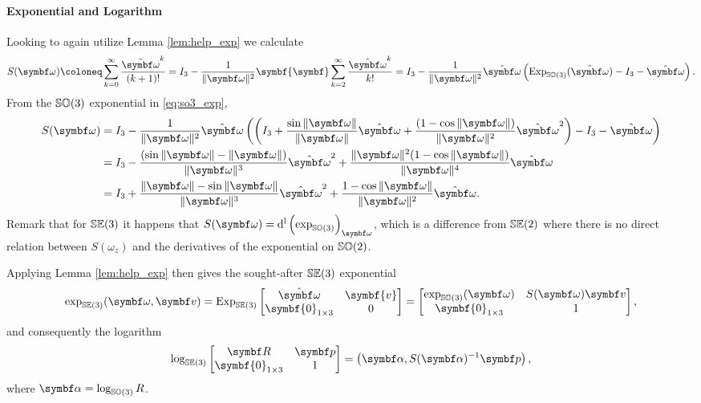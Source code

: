 \paragraph{Exponential and Logarithm}

Looking to again utilize Lemma \ref{lem:help_exp} we calculate
\begin{equation}
  S(\bomega) \coloneq \sum\limits_{k=0}^\infty \frac{\hat{\bomega}^{k}} {(k+1)!} = I_3 - \frac{1}{\| \symbf\omega \|^2} {\symbf{\symbf}} \sum\limits_{k=2}^\infty \frac{\hat{\bomega}^k}{k!} = I_3  - \frac{1}{\| \symbf\omega \|^2} \hat {\bomega} \left( \Exp_\SOthree(\hat {\bomega}) - I_3 - \hat{\bomega} \right).
\end{equation}
From the ${\mathbb{SO}(3)}$ exponential in \eqref{eq:so3_exp},
\begin{equation}
  \label{eq:so3_leftjac}
  \begin{aligned}
    S(\bomega)
     & = I_3  - \frac{1}{\| \bomega \|^2} \hat {\bomega} \left( \left( I_3 + \frac{ \sin \| \bomega \|}{\| \bomega \|} \hat{\bomega} + \frac{ (1 - \cos \| \bomega \|)}{\| \bomega \|^2} \hat{\bomega}^2 \right) - I_3 - \hat{\bomega} \right)
    \\
     & = I_3 - \frac{ (\sin \| \bomega \| -\| \bomega \|)  }{\| \bomega\|^3} \hat {\bomega}^2 + \frac{\| \bomega \|^2  (1 - \cos \| \bomega \| ) }{\| \bomega \|^4} \hat {\bomega}
    \\
     & = I_3 + \frac{ \| \bomega \| - \sin \| \bomega \| }{\| \bomega\|^3} \hat {\bomega}^2 + \frac{1 - \cos \| \bomega \|}{\| \bomega \|^2} \hat {\bomega} .
  \end{aligned}
\end{equation}
Remark that for ${\mathbb{SE}(3)}$ it happens that $S(\bomega) = \dl \left( \exp_\SOthree \right)_\bomega$, which is a difference from ${\mathbb{SE}(2)}$ where there is no direct relation between $S(\omega_z)$ and the derivatives of the exponential on ${\mathbb{SO}(2)}$.

Applying Lemma \ref{lem:help_exp} then gives the sought-after ${\mathbb{SE}(3)}$ exponential
\begin{equation}
  \exp_\SEthree (\bomega, \bv) = \Exp_\SEthree \begin{bmatrix}
    \hat{\bomega} & \symbf{v} \\ \symbf{0}_{1 \times 3} & 0
  \end{bmatrix} = \begin{bmatrix}
    \exp_{\SOthree}(\bomega) & S(\bomega) \symbf v \\ \symbf{0}_{1 \times 3} & 1
  \end{bmatrix},
\end{equation}
and consequently the logarithm
\begin{equation}
  \log_\SEthree \begin{bmatrix}
    \bR & \bp \\ \symbf{0}_{1 \times 3} & 1
  \end{bmatrix}                                = \left(\symbf \alpha, S(\symbf \alpha)^{-1} \bp  \right),
\end{equation}
where $\symbf \alpha = \log_\SOthree R$.

